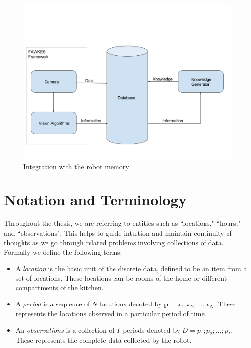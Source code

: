 \begin{figure}[htp]
\centering
\includegraphics[width=\textwidth]{images/integration.png}
\caption{Integration with the robot memory}
\label{fig:architecture}
\end{figure}


\section{Notation and Terminology}
Throughout the thesis, we are referring to entities such as ``locations," ``hours," and ``observations".
This helps to guide intuition and maintain continuity of thoughts as we go through related problems involving collections of data.
Formally we define the following terms:
\begin{itemize}
	\item A \emph{location} is the basic unit of the discrete data, defined to be an item from a set of locations. These locations can be rooms of the home or different compartments of the kitchen. 
	\item A \emph{period} is a sequence of $N$ locations denoted by $\textbf{p} = {x_1;x_2; \dots ;x_N}$. These represents the locations observed in a particular period of time.
	\item An \emph{observations} is a collection of $T$ periods denoted by $ D = {p_1;p_2; \dots ;p_T}$. These represents the complete data collected by the robot.
\end{itemize}



